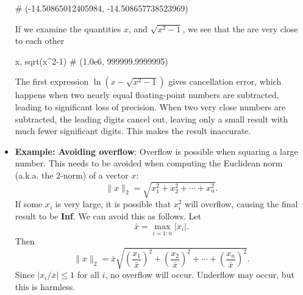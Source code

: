 \documentclass{report}
\begin{document}
\begin{itemize}
\begin{jlcode}
            # (-14.50865012405984, -14.508657738523969)
            \end{jlcode}
            \bigbreak \noindent 
            If we examine the quantities $x$, and $\sqrt{x^{2}-1}$, we see that the are very close to each other
            \bigbreak \noindent 
            \begin{jlcode}
            x, sqrt(x^2-1)
            # (1.0e6, 999999.9999995)
            \end{jlcode}
            \bigbreak \noindent 
            The first expression $\ln{\left(x- \sqrt{x^{2}-1}\right)} $ gives cancellation error, which happens when two nearly equal floating-point numbers are subtracted, leading to significant loss of precision.
            \bigbreak \noindent 
            When two very close numbers are subtracted, the leading digits cancel out, leaving only a small result with much fewer significant digits. This makes the result inaccurate.
        \item \textbf{Example: Avoiding overflow}: 
            Overflow is possible when squaring a large number. This needs to be avoided when computing the Euclidean norm (a.k.a. the $2$-norm) of a vector $x$:
            $$
            \|x\|_2 = \sqrt{x_1^2 + x_2^2 + \cdots + x_n^2}.
            $$
            \bigbreak \noindent 
            If some $x_i$ is very large, it is possible that $x_i^2$ will overflow, causing the final result to be \textbf{Inf}. We can avoid this as follows.
            \bigbreak \noindent 
            Let 
            $$\bar{x} = \max_{i=1:n} |x_i|.$$
            Then
            $$
            \|x\|_2 = \bar{x} \sqrt{\left(\frac{x_1}{\bar{x}}\right)^2 + \left(\frac{x_2}{\bar{x}}\right)^2 + \cdots + \left(\frac{x_n}{\bar{x}}\right)^2}.
            $$
            Since $|x_i/\bar{x}| \leq 1$ for all $i$, no overflow will occur. Underflow may occur, but this is harmless.











    \end{itemize}

    \pagebreak 
\end{document}
